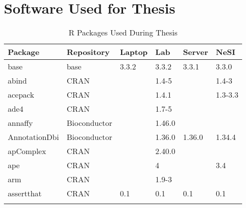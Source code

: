 \chapter{Software Used for Thesis}
\label{appendix:software}

\setlength{\LTleft}{-20cm plus -1fill}
\setlength{\LTright}{\LTleft}

\begin{longtable}{|llllll|}
\caption{R Packages Used During Thesis}
\label{tab:computers_r_packages_full}
\\
\multicolumn{1}{l}{Package}  & \multicolumn{1}{l}{Repository}  & \multicolumn{1}{l}{Laptop}      & \multicolumn{1}{l}{Lab}         & \multicolumn{1}{l}{Server}         & \multicolumn{1}{l}{NeSI} \\ \hline \rowcolor{gray!25}
base                          & base                      & 3.3.2       & 3.3.2       & 3.3.1          & 3.3.0            \\ \hline
abind                         & CRAN                      &             & 1.4-5       &                & 1.4-3             \\ \hline \rowcolor{gray!25}
acepack                       & CRAN                      &             & 1.4.1       &                & 1.3-3.3          \\ \hline
ade4                          & CRAN                      &             & 1.7-5       &                &                   \\ \hline \rowcolor{gray!25}
annaffy                       & Bioconductor              &             & 1.46.0      &                &                  \\ \hline
AnnotationDbi                 & Bioconductor              &             & 1.36.0      & 1.36.0         & 1.34.4            \\ \hline \rowcolor{gray!25}
apComplex                     & CRAN                      &             & 2.40.0      &                &                  \\ \hline
ape                           & CRAN                      &             & 4           &                & 3.4               \\ \hline \rowcolor{gray!25}
arm                           & CRAN                      &             & 1.9-3       &                &                  \\ \hline
assertthat                    & CRAN                      & 0.1         & 0.1         & 0.1            & 0.1               \\ \hline \rowcolor{gray!25}

\end{longtable}
